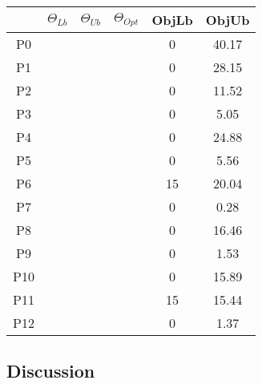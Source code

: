 \documentclass[paper=a4, fontsize=11pt]{scrartcl} %
\numberwithin{equation}{section} %
\numberwithin{figure}{section} %
\numberwithin{table}{section} %
\begin{document}
\begin{center}
    \begin{tabular}{ | c | c | c | c | c | c |}
    \hline
     & $\Theta_{Lb}$ & $\Theta_{Ub}$ & $\Theta_{Opt}$ & ObjLb & ObjUb \\ 
    \hline
    P0 & & & & 0 & 40.17\\ 
    \hline
    P1 & & & & 0 & 28.15 \\ 
    \hline
    P2  & & & & 0 & 11.52\\
    \hline
    P3  & & & & 0 & 5.05\\
    \hline
    P4  & & & & 0 & 24.88\\
    \hline
    P5   & & & & 0 & 5.56\\ 
    \hline
    P6   & & & & 15 & 20.04\\ 
    \hline
    P7   & & & & 0 & 0.28\\ 
    \hline
    P8   & & & & 0 & 16.46\\ 
    \hline
    P9   & & & & 0 & 1.53\\ 
    \hline
    P10   & & & & 0 & 15.89\\
    \hline
    P11   & & & & 15 & 15.44\\
    \hline 
    P12   & & & & 0 & 1.37\\
    \hline
    \end{tabular}
\end{center} 

\subsection{Discussion}
\end{document}
